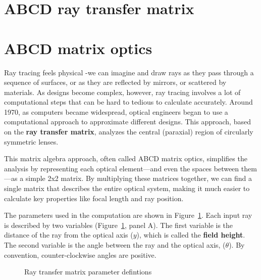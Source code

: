 \documentclass[
  letterpaper,
]{book}
\begin{document}
\section{ABCD ray transfer matrix}\label{sec-optics-abcd}

\section{ABCD matrix optics}\label{sec-optics-abcd}

Ray tracing feels physical -we can imagine and draw rays as they pass
through a sequence of surfaces, or as they are reflected by mirrors, or
scattered by materials. As designs become complex, however, ray tracing
involves a lot of computational steps that can be hard to tedious to
calculate accurately. Around 1970, as computers became widespread,
optical engineers began to use a computational approach to approximate
different designs. This approach, based on the \textbf{ray transfer
matrix}, analyzes the central (paraxial) region of circularly symmetric
lenses.

This matrix algebra approach, often called ABCD matrix optics,
simplifies the analysis by representing each optical element---and even
the spaces between them---as a simple 2x2 matrix. By multiplying these
matrices together, we can find a single matrix that describes the entire
optical system, making it much easier to calculate key properties like
focal length and ray position.

The parameters used in the computation are shown in
Figure~\ref{fig-raytransfer-definitions}. Each input ray is described by
two variables (Figure~\ref{fig-raytransfer-definitions}, panel A). The
first variable is the distance of the ray from the optical axis (\(y\)),
which is called the \textbf{field height}. The second variable is the
angle between the ray and the optical axis, (\(\theta\)). By convention,
counter-clockwise angles are positive.

\begin{figure}


\caption{\label{fig-raytransfer-definitions}Ray transfer matrix
parameter defintions}

\end{figure}%
\end{document}
